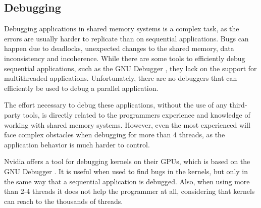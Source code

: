 \subsection{Debugging}

Debugging applications in shared memory systems is a complex task, as the errors are usually harder to replicate than on sequential applications. Bugs can happen due to deadlocks, unexpected changes to the shared memory, data inconsistency and incoherence. While there are some tools to efficiently debug sequential applications, such as the GNU Debugger \cite{GDB}, they lack on the support for multithreaded applications. Unfortunately, there are no debuggers that can efficiently be used to debug a parallel application.

The effort necessary to debug these applications, without the use of any third-party tools, is directly related to the programmers experience and knowledge of working with shared memory systems. However, even the most experienced will face complex obstacles when debugging for more than 4 threads, as the application behavior is much harder to control.

Nvidia offers a tool for debugging \cuda kernels on their GPUs, which is based on the GNU Debugger \cite{NVIDIA:gdb}. It is useful when used to find bugs in the kernels, but only in the same way that a sequential application is debugged. Also, when using more than 2-4 \cuda threads it does not help the programmer at all, considering that \cuda kernels can reach to the thousands of threads.

\newpage
